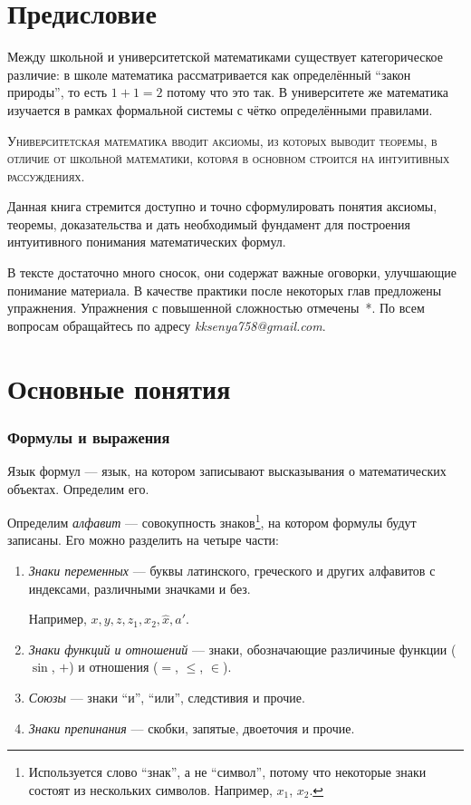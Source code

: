 \part{Предисловие}

Между школьной и университетской математиками существует категорическое
различие: в школе математика рассматривается как определённый ``закон природы'',
то есть $1+1=2$ потому что это так. В университете же математика изучается
в рамках формальной системы с чётко определёнными правилами.

\textsc{Университетская математика вводит аксиомы, из которых выводит теоремы,
  в отличие от школьной математики, которая
  в основном строится на интуитивных рассуждениях.}

Данная книга стремится доступно и точно сформулировать понятия аксиомы,
теоремы, доказательства и дать необходимый фундамент для построения
интуитивного понимания математических формул.

В тексте достаточно много сносок, они содержат важные оговорки,
улучшающие понимание материала. В качестве практики
после некоторых глав предложены упражнения. Упражнения с повышенной сложностью
отмечены~*.
По всем вопросам обращайтесь по адресу {\sl kksenya758@gmail.com}.

\part{Основные понятия}

\section{Формулы и выражения}

Язык формул --- язык, на котором записывают высказывания о математических
объектах. Определим его.

Определим {\it алфавит} --- совокупность знаков\footnote{
  Используется слово ``знак'', а не ``символ'', потому что некоторые знаки
  состоят из нескольких символов. Например, $x_1$, $x_2$.},
на котором формулы будут записаны. Его можно разделить на четыре части:
\begin{enumerate}
  \item{}{\it Знаки переменных} --- буквы латинского,
  греческого и других алфавитов с индексами, различными значками и без.

  Например, $x,y,z,z_1,x_2,\hat x,a'$.

  \item{}{\it Знаки функций и отношений}
  --- знаки, обозначающие
  различиные функции ($\sin$, $+$) и отношения ($=$, $\leq$, $\in$).

  \item{}{\it Союзы}
  --- знаки ``и'', ``или'', следстивия и прочие.

  \item{}{\it Знаки препинания} --- скобки,
  запятые, двоеточия и прочие.
\end{enumerate}

